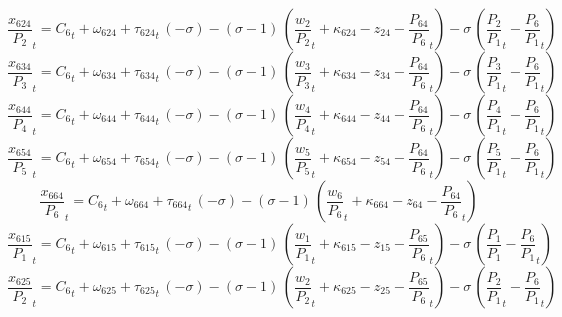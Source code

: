 \begin{dmath}
{{\frac{x_{624}}{P_{2}}}}_{t}={{C_{6}}}_{t}+{{\omega_{624}}}+{{\tau_{624}}}_{t}\, \left(-{{\sigma}}\right)-\left({{\sigma}}-1\right)\, \left({{\frac{w_{2}}{P_{2}}}}_{t}+{{\kappa_{624}}}-{{z_{24}}}-{{\frac{P_{64}}{P_{6}}}}_{t}\right)-{{\sigma}}\, \left({{\frac{P_{2}}{P_{1}}}}_{t}-{{\frac{P_{6}}{P_{1}}}}_{t}\right)
\end{dmath}
\begin{dmath}
{{\frac{x_{634}}{P_{3}}}}_{t}={{C_{6}}}_{t}+{{\omega_{634}}}+{{\tau_{634}}}_{t}\, \left(-{{\sigma}}\right)-\left({{\sigma}}-1\right)\, \left({{\frac{w_{3}}{P_{3}}}}_{t}+{{\kappa_{634}}}-{{z_{34}}}-{{\frac{P_{64}}{P_{6}}}}_{t}\right)-{{\sigma}}\, \left({{\frac{P_{3}}{P_{1}}}}_{t}-{{\frac{P_{6}}{P_{1}}}}_{t}\right)
\end{dmath}
\begin{dmath}
{{\frac{x_{644}}{P_{4}}}}_{t}={{C_{6}}}_{t}+{{\omega_{644}}}+{{\tau_{644}}}_{t}\, \left(-{{\sigma}}\right)-\left({{\sigma}}-1\right)\, \left({{\frac{w_{4}}{P_{4}}}}_{t}+{{\kappa_{644}}}-{{z_{44}}}-{{\frac{P_{64}}{P_{6}}}}_{t}\right)-{{\sigma}}\, \left({{\frac{P_{4}}{P_{1}}}}_{t}-{{\frac{P_{6}}{P_{1}}}}_{t}\right)
\end{dmath}
\begin{dmath}
{{\frac{x_{654}}{P_{5}}}}_{t}={{C_{6}}}_{t}+{{\omega_{654}}}+{{\tau_{654}}}_{t}\, \left(-{{\sigma}}\right)-\left({{\sigma}}-1\right)\, \left({{\frac{w_{5}}{P_{5}}}}_{t}+{{\kappa_{654}}}-{{z_{54}}}-{{\frac{P_{64}}{P_{6}}}}_{t}\right)-{{\sigma}}\, \left({{\frac{P_{5}}{P_{1}}}}_{t}-{{\frac{P_{6}}{P_{1}}}}_{t}\right)
\end{dmath}
\begin{dmath}
{{\frac{x_{664}}{P_{6}}}}_{t}={{C_{6}}}_{t}+{{\omega_{664}}}+{{\tau_{664}}}_{t}\, \left(-{{\sigma}}\right)-\left({{\sigma}}-1\right)\, \left({{\frac{w_{6}}{P_{6}}}}_{t}+{{\kappa_{664}}}-{{z_{64}}}-{{\frac{P_{64}}{P_{6}}}}_{t}\right)
\end{dmath}
\begin{dmath}
{{\frac{x_{615}}{P_{1}}}}_{t}={{C_{6}}}_{t}+{{\omega_{615}}}+{{\tau_{615}}}_{t}\, \left(-{{\sigma}}\right)-\left({{\sigma}}-1\right)\, \left({{\frac{w_{1}}{P_{1}}}}_{t}+{{\kappa_{615}}}-{{z_{15}}}-{{\frac{P_{65}}{P_{6}}}}_{t}\right)-{{\sigma}}\, \left({{\frac{P_{1}}{P_{1}}}}-{{\frac{P_{6}}{P_{1}}}}_{t}\right)
\end{dmath}
\begin{dmath}
{{\frac{x_{625}}{P_{2}}}}_{t}={{C_{6}}}_{t}+{{\omega_{625}}}+{{\tau_{625}}}_{t}\, \left(-{{\sigma}}\right)-\left({{\sigma}}-1\right)\, \left({{\frac{w_{2}}{P_{2}}}}_{t}+{{\kappa_{625}}}-{{z_{25}}}-{{\frac{P_{65}}{P_{6}}}}_{t}\right)-{{\sigma}}\, \left({{\frac{P_{2}}{P_{1}}}}_{t}-{{\frac{P_{6}}{P_{1}}}}_{t}\right)
\end{dmath}
